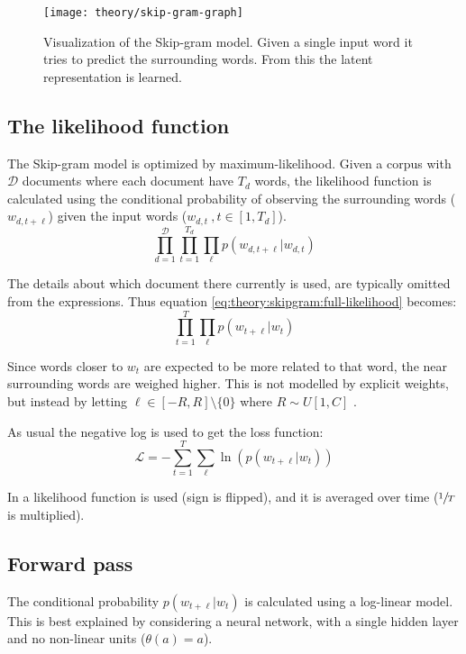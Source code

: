 \begin{figure}[h]
	\centering
	\texttt{[image: theory/skip-gram-graph]}
	\caption{Visualization of the Skip-gram model. Given a single input word it tries to predict the surrounding words. From this the latent representation is learned.}
	\label{fig:theory:skip-gram:graph}
\end{figure}

\subsection{The likelihood function}
The Skip-gram model is optimized by maximum-likelihood. Given a corpus with $\mathcal{D}$ documents where each document have $T_d$ words, the likelihood function is calculated using the conditional probability of observing the surrounding words ($w_{d, t + \ell}$) given the input words ($w_{d, t}\ , t \in [1, T_d]$).
\begin{equation}
\prod_{d = 1}^{\mathcal{D}} \prod_{t = 1}^{T_d} \prod_{\ell} p(w_{d, t + \ell} | w_{d, t})
\label{eq:theory:skipgram:full-likelihood}
\end{equation}

The details about which document there currently is used, are typically omitted from the expressions. Thus equation \eqref{eq:theory:skipgram:full-likelihood} becomes:
\begin{equation}
\prod_{t = 1}^{T} \prod_{\ell} p(w_{t + \ell} | w_{t})
\end{equation}

Since words closer to $w_t$ are expected to be more related to that word, the near surrounding words are weighed higher. This is not modelled by explicit weights, but instead by letting $\ell \in [-R, R] \setminus \{ 0 \}$ where $R \sim U[1, C]$ \cite{word2vec-comparing}.

As usual the negative log is used to get the loss function:
\begin{equation}
\mathcal{L} = - \sum_{t = 1}^T \sum_{\ell} \ln( p(w_{t + \ell} | w_t) )
\end{equation}

In \cite{word2vec-details} a likelihood function is used (sign is flipped), and it is averaged over time ($\sfrac{1}{T}$ is multiplied).

\subsection{Forward pass}
The conditional probability $p(w_{t + \ell} | w_t)$ is calculated using a log-linear model. This is best explained by considering a neural network, with a single hidden layer and no non-linear units ($\theta(a) = a$).

